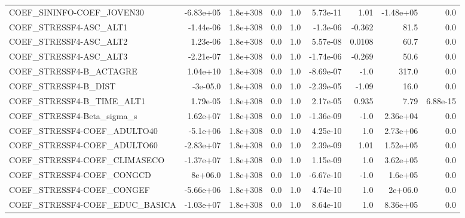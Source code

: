 \begin{tabular}{lrrrrrrrr}
COEF\_SININFO-COEF\_JOVEN30         &   -6.83e+05 &     1.8e+308 &     0.0 &      1.0 &   5.73e-11 &        1.01 &    -1.48e+05 &           0.0 \\
COEF\_STRESSF4-ASC\_ALT1            &   -1.44e-06 &     1.8e+308 &     0.0 &      1.0 &   -1.3e-06 &      -0.362 &         81.5 &           0.0 \\
COEF\_STRESSF4-ASC\_ALT2            &    1.23e-06 &     1.8e+308 &     0.0 &      1.0 &   5.57e-08 &      0.0108 &         60.7 &           0.0 \\
COEF\_STRESSF4-ASC\_ALT3            &   -2.21e-07 &     1.8e+308 &     0.0 &      1.0 &  -1.74e-06 &      -0.269 &         50.6 &           0.0 \\
COEF\_STRESSF4-B\_ACTAGRE           &    1.04e+10 &     1.8e+308 &     0.0 &      1.0 &  -8.69e-07 &        -1.0 &        317.0 &           0.0 \\
COEF\_STRESSF4-B\_DIST              &    -3e-05.0 &     1.8e+308 &     0.0 &      1.0 &  -2.39e-05 &       -1.09 &         16.0 &           0.0 \\
COEF\_STRESSF4-B\_TIME\_ALT1         &    1.79e-05 &     1.8e+308 &     0.0 &      1.0 &   2.17e-05 &       0.935 &         7.79 &      6.88e-15 \\
COEF\_STRESSF4-Beta\_sigma\_s        &    1.62e+07 &     1.8e+308 &     0.0 &      1.0 &  -1.36e-09 &        -1.0 &     2.36e+04 &           0.0 \\
COEF\_STRESSF4-COEF\_ADULTO40       &    -5.1e+06 &     1.8e+308 &     0.0 &      1.0 &   4.25e-10 &         1.0 &     2.73e+06 &           0.0 \\
COEF\_STRESSF4-COEF\_ADULTO60       &   -2.83e+07 &     1.8e+308 &     0.0 &      1.0 &   2.39e-09 &        1.01 &     1.52e+05 &           0.0 \\
COEF\_STRESSF4-COEF\_CLIMASECO      &   -1.37e+07 &     1.8e+308 &     0.0 &      1.0 &   1.15e-09 &         1.0 &     3.62e+05 &           0.0 \\
COEF\_STRESSF4-COEF\_CONGCD         &     8e+06.0 &     1.8e+308 &     0.0 &      1.0 &  -6.67e-10 &        -1.0 &      1.6e+05 &           0.0 \\
COEF\_STRESSF4-COEF\_CONGEF         &   -5.66e+06 &     1.8e+308 &     0.0 &      1.0 &   4.74e-10 &         1.0 &      2e+06.0 &           0.0 \\
COEF\_STRESSF4-COEF\_EDUC\_BASICA    &   -1.03e+07 &     1.8e+308 &     0.0 &      1.0 &   8.64e-10 &         1.0 &     8.36e+05 &           0.0 \\

\end{tabular}
